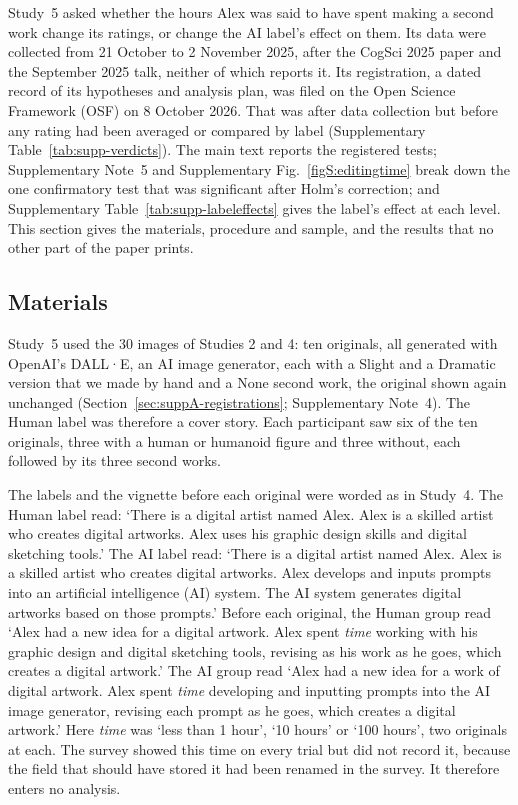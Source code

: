 \label{sec:suppB-study5}

Study~5 asked whether the hours Alex was said to have spent making a second work change its ratings, or change the AI label's effect on them. Its data were collected from 21 October to 2 November 2025, after the CogSci 2025 paper and the September 2025 talk, neither of which reports it. Its registration, a dated record of its hypotheses and analysis plan, was filed on the Open Science Framework (OSF) on 8 October 2026. That was after data collection but before any rating had been averaged or compared by label (Supplementary Table~\ref{tab:supp-verdicts}). The main text reports the registered tests; Supplementary Note~5 and Supplementary Fig.~\ref{figS:editingtime} break down the one confirmatory test that was significant after Holm's correction; and Supplementary Table~\ref{tab:supp-labeleffects} gives the label's effect at each level. This section gives the materials, procedure and sample, and the results that no other part of the paper prints.

\subsection*{Materials}

Study~5 used the 30 images of Studies 2 and 4: ten originals, all generated with OpenAI's DALL·E, an AI image generator, each with a Slight and a Dramatic version that we made by hand and a None second work, the original shown again unchanged (Section~\ref{sec:suppA-registrations}; Supplementary Note~4). The Human label was therefore a cover story. Each participant saw six of the ten originals, three with a human or humanoid figure and three without, each followed by its three second works.

The labels and the vignette before each original were worded as in Study~4. The Human label read: `There is a digital artist named Alex. Alex is a skilled artist who creates digital artworks. Alex uses his graphic design skills and digital sketching tools.' The AI label read: `There is a digital artist named Alex. Alex is a skilled artist who creates digital artworks. Alex develops and inputs prompts into an artificial intelligence (AI) system. The AI system generates digital artworks based on those prompts.' Before each original, the Human group read `Alex had a new idea for a digital artwork. Alex spent \textit{time} working with his graphic design and digital sketching tools, revising as his work as he goes, which creates a digital artwork.' The AI group read `Alex had a new idea for a work of digital artwork. Alex spent \textit{time} developing and inputting prompts into the AI image generator, revising each prompt as he goes, which creates a digital artwork.' Here \textit{time} was `less than 1 hour', `10 hours' or `100 hours', two originals at each. The survey showed this time on every trial but did not record it, because the field that should have stored it had been renamed in the survey. It therefore enters no analysis.

